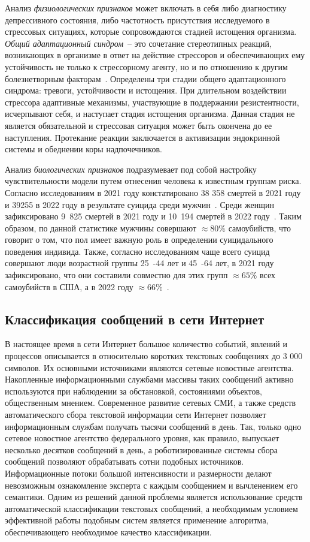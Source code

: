 Анализ \textit{физиологических признаков} может включать в себя либо диагностику депрессивного состояния, либо частотность присутствия исследуемого в стрессовых ситуациях, которые сопровождаются стадией истощения организма. \textit{Общий адаптационный синдром}~-- это сочетание стереотипных реакций, возникающих в организме в ответ на действие стрессоров и обеспечивающих ему устойчивость не только к стрессорному агенту, но и по отношению к другим болезнетворным факторам~\cite{stressAndPatology}. Определены три стадии общего адаптационного синдрома: тревоги, устойчивости и истощения. При длительном воздействии стрессора адаптивные механизмы, участвующие в поддержании резистентности, исчерпывают себя, и наступает стадия истощения организма. Данная стадия не является обязательной и стрессовая ситуация может быть окончена до ее наступления. Протекание реакции заключается в активизации эндокринной системы и обеднении коры надпочечников.~\cite{stressAndPatology}

Анализ \textit{биологических признаков} подразумевает под собой настройку чувствительности модели путем отнесения человека к известным группам риска. Согласно исследованиям в 2021 году констатировано 38 358 смертей в 2021 году и 39255 в 2022 году в результате суицида среди мужчин~\cite{suicideStats}. Среди женщин зафиксировано 9~825 смертей в 2021 году и 10~194 смертей в 2022 году~\cite{suicideStats}. Таким образом, по данной статистике мужчины совершают $\approx 80\%$ самоубийств, что говорит о том, что пол имеет важную роль в определении суицидального поведения индивида. Также, согласно исследованиям чаще всего суицид совершают люди возрастной группы 25~-44 лет и 45~-64 лет, в 2021 году зафиксировано, что они составили совместно для этих групп $\approx 65 \%$ всех самоубийств в США, а в 2022 году $\approx 66\%$~\cite{suicideStats}.


\subsection{Классификация сообщений в сети Интернет}

В настоящее время в сети Интернет большое количество событий, явлений и процессов описывается в относительно коротких текстовых сообщениях до 3 000 символов.
Их основными источниками являются сетевые новостные агентства.
Накопленные информационными службами массивы таких сообщений активно используются при наблюдении за обстановкой, состояниями объектов, общественным мнением.
Современное развитие сетевых СМИ, а также средств автоматического сбора текстовой информации сети Интернет позволяет информационным службам получать тысячи сообщений в день.
Так, только одно сетевое новостное агентство федерального уровня, как правило, выпускает несколько десятков сообщений в день, а роботизированные системы сбора сообщений позволяют обрабатывать сотни подобных источников.
Информационные потоки большой интенсивности и размерности делают невозможным ознакомление эксперта с каждым сообщением и вычленением его семантики.
Одним из решений данной проблемы является использование средств автоматической классификации текстовых сообщений, а необходимым условием эффективной работы подобным систем является применение алгоритма, обеспечивающего необходимое качество классификации. \cite{messageClassification}

